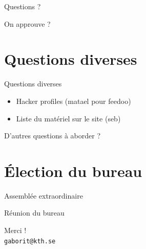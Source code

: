 \documentclass[10pt]{beamer}
\begin{document}
\begin{frame}[standout]
	Questions ?
\end{frame}

\begin{frame}[standout]
	On approuve ?
\end{frame}

\section{Questions diverses}

\begin{frame}{Questions diverses}
	\begin{itemize}
		\item Hacker profiles (matael pour feedoo)
		\item Liste du matériel sur le site (seb)
	\end{itemize}
	\vfill
	\begin{center}
		\large
		D'autres questions à aborder ?
	\end{center}
\end{frame}

\section{Élection du bureau}

\begin{frame}[standout]
	Assemblée extraordinaire
\end{frame}

\begin{frame}[standout]
	Réunion du bureau
\end{frame}

\begin{frame}[standout] %
	\vspace{0.05\textwidth}
	Merci !\\
	\vspace{0.25\textwidth}
	\small{\texttt{gaborit@kth.se}}\\
\end{frame}
\end{document}
